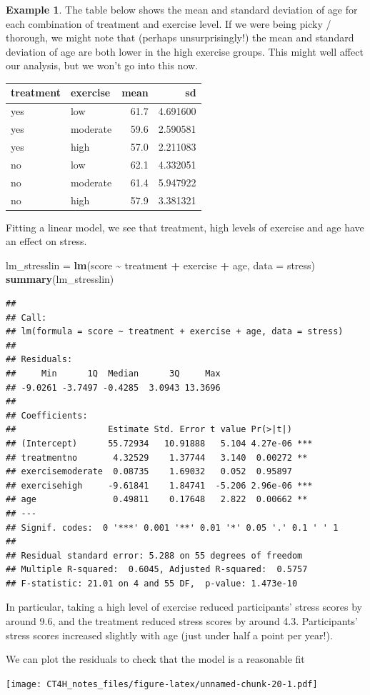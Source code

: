 \documentclass[
  openany]{book}
\newenvironment{Shaded}{\begin{snugshade}}{\end{snugshade}}
\newcommand{\AttributeTok}[1]{\textcolor[rgb]{0.13,0.29,0.53}{#1}}
\newcommand{\FunctionTok}[1]{\textcolor[rgb]{0.13,0.29,0.53}{\textbf{#1}}}
\newcommand{\NormalTok}[1]{#1}
\newcommand{\OtherTok}[1]{\textcolor[rgb]{0.56,0.35,0.01}{#1}}
\newcommand{\SpecialCharTok}[1]{\textcolor[rgb]{0.81,0.36,0.00}{\textbf{#1}}}
\theoremstyle{definition}
\theoremstyle{definition}
\newtheorem{example}{Example}[chapter]
\theoremstyle{definition}
\theoremstyle{definition}
\theoremstyle{remark}
\begin{document}
\begin{example}
The table below shows the mean and standard deviation of age for each combination of treatment and exercise level. If we were being picky / thorough, we might note that (perhaps unsurprisingly!) the mean and standard deviation of age are both lower in the high exercise groups. This might well affect our analysis, but we won't go into this now.

\begin{tabular}{l|l|r|r}
\hline
treatment & exercise & mean & sd\\
\hline
yes & low & 61.7 & 4.691600\\
\hline
yes & moderate & 59.6 & 2.590581\\
\hline
yes & high & 57.0 & 2.211083\\
\hline
no & low & 62.1 & 4.332051\\
\hline
no & moderate & 61.4 & 5.947922\\
\hline
no & high & 57.9 & 3.381321\\
\hline
\end{tabular}

Fitting a linear model, we see that treatment, high levels of exercise and age have an effect on stress.

\begin{Shaded}
\begin{Highlighting}[]
\NormalTok{lm\_stresslin }\OtherTok{=} \FunctionTok{lm}\NormalTok{(score }\SpecialCharTok{\textasciitilde{}}\NormalTok{ treatment }\SpecialCharTok{+}\NormalTok{ exercise }\SpecialCharTok{+}\NormalTok{ age, }\AttributeTok{data =}\NormalTok{ stress)}
\FunctionTok{summary}\NormalTok{(lm\_stresslin)}
\end{Highlighting}
\end{Shaded}

\begin{verbatim}
## 
## Call:
## lm(formula = score ~ treatment + exercise + age, data = stress)
## 
## Residuals:
##     Min      1Q  Median      3Q     Max 
## -9.0261 -3.7497 -0.4285  3.0943 13.3696 
## 
## Coefficients:
##                  Estimate Std. Error t value Pr(>|t|)    
## (Intercept)      55.72934   10.91888   5.104 4.27e-06 ***
## treatmentno       4.32529    1.37744   3.140  0.00272 ** 
## exercisemoderate  0.08735    1.69032   0.052  0.95897    
## exercisehigh     -9.61841    1.84741  -5.206 2.96e-06 ***
## age               0.49811    0.17648   2.822  0.00662 ** 
## ---
## Signif. codes:  0 '***' 0.001 '**' 0.01 '*' 0.05 '.' 0.1 ' ' 1
## 
## Residual standard error: 5.288 on 55 degrees of freedom
## Multiple R-squared:  0.6045, Adjusted R-squared:  0.5757 
## F-statistic: 21.01 on 4 and 55 DF,  p-value: 1.473e-10
\end{verbatim}

In particular, taking a high level of exercise reduced participants' stress scores by around 9.6, and the treatment reduced stress scores by around 4.3. Participants' stress scores increased slightly with age (just under half a point per year!).

We can plot the residuals to check that the model is a reasonable fit

\texttt{[image: CT4H\_notes\_files/figure-latex/unnamed-chunk-20-1.pdf]}
\end{example}
\end{document}

